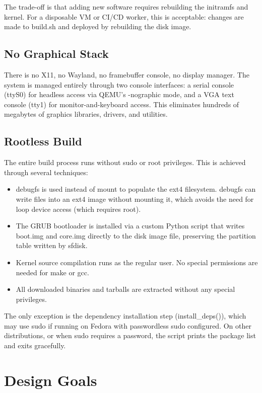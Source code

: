 The trade-off is that adding new software requires rebuilding the initramfs
and kernel. For a disposable VM or CI/CD worker, this is acceptable: changes
are made to build.sh and deployed by rebuilding the disk image.

\subsection{No Graphical Stack}

There is no X11, no Wayland, no framebuffer console, no display manager.
The system is managed entirely through two console interfaces: a serial
console (ttyS0) for headless access via QEMU's -nographic mode, and a
VGA text console (tty1) for monitor-and-keyboard access. This eliminates
hundreds of megabytes of graphics libraries, drivers, and utilities.

\subsection{Rootless Build}

The entire build process runs without sudo or root privileges. This is
achieved through several techniques:

\begin{itemize}[nosep]
  \item debugfs is used instead of mount to populate the ext4 filesystem.
        debugfs can write files into an ext4 image without mounting it,
        which avoids the need for loop device access (which requires root).
  \item The GRUB bootloader is installed via a custom Python script that
        writes boot.img and core.img directly to the disk image file,
        preserving the partition table written by sfdisk.
  \item Kernel source compilation runs as the regular user. No special
        permissions are needed for make or gcc.
  \item All downloaded binaries and tarballs are extracted without any
        special privileges.
\end{itemize}

The only exception is the dependency installation step (install\_deps()),
which may use sudo if running on Fedora with passwordless sudo configured.
On other distributions, or when sudo requires a password, the script prints
the package list and exits gracefully.

\section{Design Goals}

